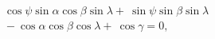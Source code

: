 \documentclass[preview]{standalone}
\begin{document}
\begin{align*}
\begin{split}\
                           \cos\psi \sin\alpha \cos\beta \sin\lambda +\
                           \sin\psi \sin\beta \sin\lambda \\ \
                           - \cos\alpha \cos\beta \cos\lambda +\
                           \cos \gamma = 0,\
                           \end{split}
\end{align*}
\end{document}
